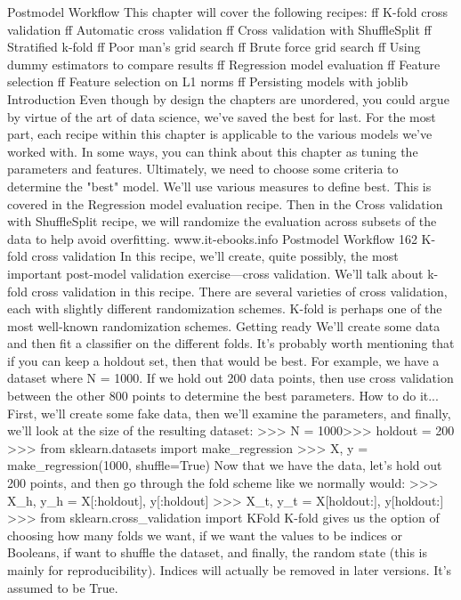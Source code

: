 Postmodel Workflow
This chapter will cover the following recipes:
ff K-fold cross validation
ff Automatic cross validation
ff Cross validation with ShuffleSplit
ff Stratified k-fold
ff Poor man's grid search
ff Brute force grid search
ff Using dummy estimators to compare results
ff Regression model evaluation
ff Feature selection
ff Feature selection on L1 norms
ff Persisting models with joblib
Introduction
Even though by design the chapters are unordered, you could argue by virtue of the art of
data science, we've saved the best for last.
For the most part, each recipe within this chapter is applicable to the various models we've
worked with. In some ways, you can think about this chapter as tuning the parameters and
features. Ultimately, we need to choose some criteria to determine the "best" model. We'll use
various measures to define best. This is covered in the Regression model evaluation recipe.
Then in the Cross validation with ShuffleSplit recipe, we will randomize the evaluation across
subsets of the data to help avoid overfitting.
www.it-ebooks.info
Postmodel Workflow
162
K-fold cross validation
In this recipe, we'll create, quite possibly, the most important post-model validation
exercise—cross validation. We'll talk about k-fold cross validation in this recipe. There are
several varieties of cross validation, each with slightly different randomization schemes.
K-fold is perhaps one of the most well-known randomization schemes.
Getting ready
We'll create some data and then fit a classifier on the different folds. It's probably worth
mentioning that if you can keep a holdout set, then that would be best. For example, we
have a dataset where N = 1000. If we hold out 200 data points, then use cross validation
between the other 800 points to determine the best parameters.
How to do it...
First, we'll create some fake data, then we'll examine the parameters, and finally, we'll look
at the size of the resulting dataset:
>>> N = 1000>>>
holdout = 200
>>> from sklearn.datasets import make_regression
>>> X, y = make_regression(1000, shuffle=True)
Now that we have the data, let's hold out 200 points, and then go through the fold scheme
like we normally would:
>>> X_h, y_h = X[:holdout], y[:holdout]
>>> X_t, y_t = X[holdout:], y[holdout:]
>>> from sklearn.cross_validation import KFold
K-fold gives us the option of choosing how many folds we want, if we want the values to be
indices or Booleans, if want to shuffle the dataset, and finally, the random state (this is mainly
for reproducibility). Indices will actually be removed in later versions. It's assumed to be True.
